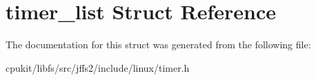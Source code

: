 \hypertarget{structtimer__list}{}\section{timer\+\_\+list Struct Reference}
\label{structtimer__list}


The documentation for this struct was generated from the following file\+:\begin{DoxyCompactItemize}
\item 
cpukit/libfs/src/jffs2/include/linux/timer.\+h\end{DoxyCompactItemize}
